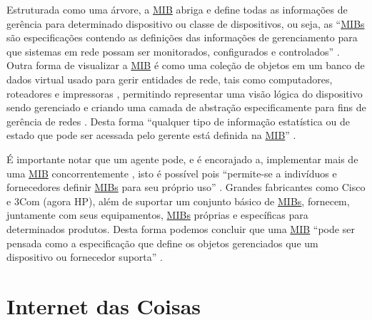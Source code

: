 \documentclass[twoside,english,brazilian]{UNISINOSmonografia}
\begin{document}
Estruturada como uma árvore, a \hyperref[siglas]{MIB} abriga e define todas as informações de 
gerência para determinado dispositivo ou classe de dispositivos, ou seja, as
``\hyperref[siglas]{MIBs} são especificações contendo as definições das informações de 
gerenciamento para que sistemas em rede possam ser monitorados, configurados e 
controlados''
\cite[p.~1]{perkins1997understanding}.
Outra forma de visualizar a \hyperref[siglas]{MIB} é como uma coleção de objetos em um banco de 
dados virtual usado para gerir entidades de rede, tais como computadores, 
roteadores e impressoras 
\cite{Ding2009}, permitindo representar uma visão lógica do dispositivo sendo 
gerenciado e criando uma camada de abstração especificamente para fins de 
gerência de redes 
\cite{Clemm2006}.
Desta forma 
``qualquer tipo de informação estatística ou de estado que pode ser acessada 
pelo gerente está definida na \hyperref[siglas]{MIB}''
\cite[p.~4]{Mauro2009}.

É importante notar que um agente pode, e é encorajado a, 
implementar mais de uma \hyperref[siglas]{MIB} concorrentemente 
\cite{Clemm2006}, 
isto é possível pois 
``permite-se a indivíduos e fornecedores definir \hyperref[siglas]{MIBs} para seu próprio uso'' 
\cite[p.~5]{Mauro2009}. 
Grandes fabricantes como Cisco e 3Com (agora HP), além de suportar um 
conjunto básico de \hyperref[siglas]{MIBs}, fornecem, juntamente com seus equipamentos, \hyperref[siglas]{MIBs} 
próprias e específicas para determinados produtos.
Desta forma podemos concluir que uma \hyperref[siglas]{MIB} 
``pode ser pensada como a especificação que define os objetos gerenciados que 
um dispositivo ou fornecedor suporta''
\cite[p.~27]{Mauro2009}.


\chapter{Internet das Coisas}
\end{document}
